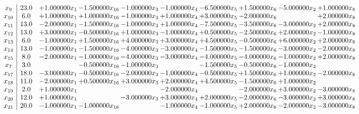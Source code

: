 \documentclass[10pt]{article}
\begin{document}
 \[\begin{array}{c| c c@{\hskip 2pt} c@{\hskip 2pt} c@{\hskip 2pt} c@{\hskip 2pt} c@{\hskip 2pt} c@{\hskip 2pt} c@{\hskip 2pt} c@{\hskip 2pt} }
 x_{9}   &  23.0 & + 1.000000 x_{1} & -1.500000 x_{16} & -1.000000 x_{3} & -1.000000 x_{4} & -6.500000 x_{5} & + 1.500000 x_{6} & -5.000000 x_{2} & + 1.000000 x_{8}\\
 x_{10}   &  6.0 & + 1.000000 x_{1} & + 1.000000 x_{16} & -1.000000 x_{3} & + 1.000000 x_{4} & + 3.000000 x_{5} & -2.000000 x_{6} &   & + 2.000000 x_{8}\\
 x_{11}   &  13.0 & -2.000000 x_{1} & -1.500000 x_{16} & -1.000000 x_{3} & + 1.000000 x_{4} & -7.500000 x_{5} & -3.500000 x_{6} & -3.000000 x_{2} & + 2.000000 x_{8}\\
 x_{12}   &  13.0 & + 3.000000 x_{1} & -0.500000 x_{16} & + 1.000000 x_{3} & -1.000000 x_{4} & + 0.500000 x_{5} & -2.500000 x_{6} & + 2.000000 x_{2} & -1.000000 x_{8}\\
 x_{13}   &  6.0 & -1.000000 x_{1} & + 1.500000 x_{16} & + 4.000000 x_{3} & + 3.000000 x_{4} & + 4.500000 x_{5} & -0.500000 x_{6} & + 6.000000 x_{2} & + 2.000000 x_{8}\\
 x_{14}   &  13.0 & -1.000000 x_{1} & -1.500000 x_{16} & -4.000000 x_{3} & -3.000000 x_{4} & -1.500000 x_{5} & -1.500000 x_{6} & -3.000000 x_{2} & -2.000000 x_{8}\\
 x_{15}   &  8.0 & -2.000000 x_{1} & -1.000000 x_{16} & -4.000000 x_{3} & -3.000000 x_{4} & -4.000000 x_{5} & -4.000000 x_{6} & -1.000000 x_{2} & + 2.000000 x_{8}\\
 x_{7}   &  3.0  &   & -0.500000 x_{16} & -1.000000 x_{3} &   & -1.500000 x_{5} & -0.500000 x_{6} & -1.000000 x_{2} &   \\
 x_{17}   &  18.0 & -3.000000 x_{1} & -0.500000 x_{16} & -2.000000 x_{3} & -1.000000 x_{4} & -0.500000 x_{5} & + 1.500000 x_{6} & + 1.000000 x_{2} & -2.000000 x_{8}\\
 x_{18}   &  11.0 & -2.000000 x_{1} & + 0.500000 x_{16} & + 3.000000 x_{3} & + 2.000000 x_{4} & + 4.500000 x_{5} & -1.500000 x_{6} & + 1.000000 x_{2} &   \\
 x_{19}   &  2.0 & + 1.000000 x_{1} &    &   & -2.000000 x_{4} &   & -2.000000 x_{6} & + 3.000000 x_{2} & -3.000000 x_{8}\\
 x_{20}   &  12.0 & + 1.000000 x_{1} &   & -3.000000 x_{3} & + 3.000000 x_{4} & + 2.000000 x_{5} & -2.000000 x_{6} & -3.000000 x_{2} & + 3.000000 x_{8}\\
 x_{21}   &  20.0 & -1.000000 x_{1} & -1.000000 x_{16} &   & -1.000000 x_{4} & -1.000000 x_{5} & + 2.000000 x_{6} & -2.000000 x_{2} & -3.000000 x_{8}\\

\end{array}\]
\end{document}
